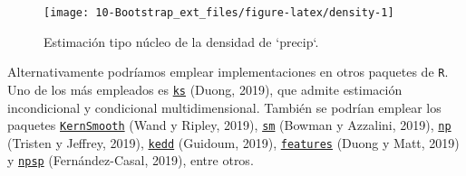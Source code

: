 \documentclass[
  10pt,
]{book}
\newenvironment{Shaded}{\begin{snugshade}}{\end{snugshade}}
\newcommand{\AttributeTok}[1]{\textcolor[rgb]{0.77,0.63,0.00}{#1}}
\newcommand{\CommentTok}[1]{\textcolor[rgb]{0.56,0.35,0.01}{\textit{#1}}}
\newcommand{\ConstantTok}[1]{\textcolor[rgb]{0.00,0.00,0.00}{#1}}
\newcommand{\DecValTok}[1]{\textcolor[rgb]{0.00,0.00,0.81}{#1}}
\newcommand{\FloatTok}[1]{\textcolor[rgb]{0.00,0.00,0.81}{#1}}
\newcommand{\FunctionTok}[1]{\textcolor[rgb]{0.00,0.00,0.00}{#1}}
\newcommand{\NormalTok}[1]{#1}
\newcommand{\OtherTok}[1]{\textcolor[rgb]{0.56,0.35,0.01}{#1}}
\newcommand{\StringTok}[1]{\textcolor[rgb]{0.31,0.60,0.02}{#1}}
\theoremstyle{break}
\theoremstyle{nonumberplain}
\renewcommand{\CommentTok}[1]{\textcolor[rgb]{0.41,0.41,0.41}{\texttt{#1}}}
\begin{document}
\begin{Shaded}
\end{Shaded}

\begin{figure}[!htbp]

{\centering \texttt{[image: 10-Bootstrap\_ext\_files/figure-latex/density-1]} 

}

\caption{Estimación tipo núcleo de la densidad de `precip`.}\label{fig:density}
\end{figure}

Alternativamente podríamos emplear implementaciones en otros paquetes de \texttt{R}.
Uno de los más empleados es \href{https://www.mvstat.net/mvksa/}{\texttt{ks}} (Duong, 2019), que admite estimación incondicional y condicional multidimensional.
También se podrían emplear los paquetes \href{https://CRAN.R-project.org/package=KernSmooth}{\texttt{KernSmooth}} (Wand y Ripley, 2019), \href{https://CRAN.R-project.org/package=sm}{\texttt{sm}} (Bowman y Azzalini, 2019), \href{https://CRAN.R-project.org/package=np}{\texttt{np}} (Tristen y Jeffrey, 2019), \href{https://gitlab.com/iagogv/kedd}{\texttt{kedd}} (Guidoum, 2019), \href{https://CRAN.R-project.org/package=features}{\texttt{features}} (Duong y Matt, 2019) y \href{https://rubenfcasal.github.io/npsp/}{\texttt{npsp}} (Fernández-Casal, 2019), entre otros.
\end{document}
